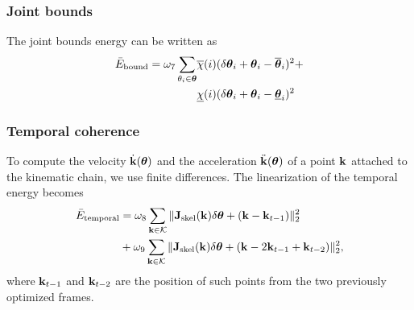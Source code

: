 \subsubsection*{Joint bounds} 
The joint bounds energy can be written as
%
\begin{align*}
\bar{E}_{\text{bound}} = \omega_7 \sum_{\theta_i \in \boldsymbol{\theta}} &\overline{\chi}(i)(\delta\boldsymbol{\theta}_i + \boldsymbol{\theta}_i - \overline{\boldsymbol{\theta}}_i)^2 + \nonumber \\
 &\underline{\chi}(i)(\delta\boldsymbol{\theta}_i + \boldsymbol{\theta}_i - \underline{\boldsymbol{\theta}}_i)^2
\end{align*}
% 

% 
%  
% 
%
\subsubsection*{Temporal coherence} To compute the velocity $\dot {\mathbf{k}}(\boldsymbol{\theta})$ and the acceleration $\ddot {\mathbf{k}}(\boldsymbol{\theta})$ of a point $\mathbf{k}$ attached to the kinematic chain, we use finite differences. The linearization of the temporal energy becomes
% 
\begin{align*}
\bar{E}_{\text{temporal}} &= \omega_8 \sum_{\mathbf{k} \in \mathcal{K}} \|\mathbf{J}_{\text{skel}}(\mathbf{k})\delta\boldsymbol{\theta} + (\mathbf{k} - \mathbf{k}_{t-1})\|_2^2 \\
&+\omega_9 \sum_{\mathbf{k} \in \mathcal{K}} \|\mathbf{J}_{\text{skel}}(\mathbf{k})\delta\boldsymbol{\theta} + (\mathbf{k} - 2\mathbf{k}_{t-1} + \mathbf{k}_{t-2})\|_2^2,
\end{align*}
where $\mathbf{k}_{t-1}$ and $\mathbf{k}_{t-2}$ are the position of such points from the two previously optimized frames.
% 
% 
%  
% 
%  
